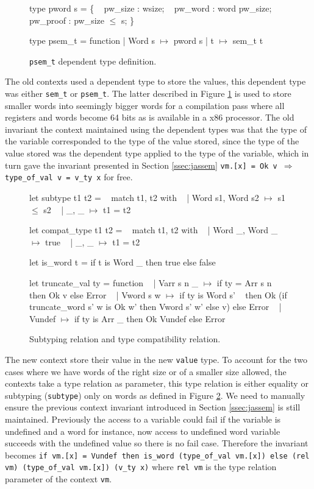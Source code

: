 \documentclass{article}
\begin{document}
\medskip

\begin{figure}
\obeylines\obeyspaces\ttfamily%
type pword s = \{
~ pw\_size  : wsize;
~ pw\_word  : word pw\_size;
~ pw\_proof : pw\_size \(\leq\) s;
\}

type psem\_t = function
| Word s \(\mapsto\) pword s
| t      \(\mapsto\) sem\_t t
\normalfont%
\caption{\texttt{psem\_t} dependent type definition.}\label{fig:psemt}
\end{figure}

The old contexts used a dependent type to store the values, this dependent type
was either \texttt{sem\_t} or \texttt{psem\_t}. The latter described in Figure
\ref{fig:psemt} is used to store smaller words into seemingly bigger words for
a compilation pass where all registers and words become 64 bits as is available
in a x86 processor. The old invariant the context maintained using the dependent
types was that the type of the variable corresponded to the type of the value
stored, since the type of the value stored was the dependent type applied to the
type of the variable, which in turn gave the invariant presented in Section
\ref{ssec:jassem}
\texttt{vm.[x] = Ok v \(\Longrightarrow\) type\_of\_val v = v\_ty x} for free.

\begin{figure}[t]
\obeylines\obeyspaces\ttfamily%
let subtype t1 t2 =
~ match t1, t2 with
~ | Word s1, Word s2 \(\mapsto\) s1 \(\leq\) s2
~ | \_,       \_       \(\mapsto\) t1 = t2

let compat\_type t1 t2 =
~ match t1, t2 with
~ | Word \_, Word \_ \(\mapsto\) true
~ | \_,      \_      \(\mapsto\) t1 = t2

let is\_word t = if t is Word \_ then true else false

let truncate\_val ty = function
~ | Varr s n \_ \(\mapsto\) if ty = Arr s n then Ok v else Error
~ | Vword s w  \(\mapsto\) if ty is Word s'
~   then Ok (if truncate\_word s' w is Ok w' then Vword s' w' else v) else Error
~ | Vundef     \(\mapsto\) if ty is Arr \_ then Ok Vundef else Error
\normalfont%
\normalfont%
\caption{Subtyping relation and type compatibility relation.}\label{fig:typerel}
\end{figure}

The new context store their value in the new \texttt{value} type. To account for
the two cases where we have words of the right size or of a smaller size
allowed, the contexts take a type relation as parameter, this type relation is
either equality or subtyping (\texttt{subtype}) only on words as defined in
Figure \ref{fig:typerel}. We need to manually ensure the previous context
invariant introduced in Section \ref{ssec:jassem} is still maintained.
Previously the access to a variable could fail if the variable is undefined and
a word for instance, now access to undefined word variable succeeds with the
undefined value so there is no fail case. Therefore the invariant becomes
\texttt{if vm.[x] = Vundef then is\_word (type\_of\_val vm.[x]) else (rel vm) (type\_of\_val vm.[x]) (v\_ty x)}
where \texttt{rel vm} is the type relation parameter of the context \texttt{vm}.
\end{document}
